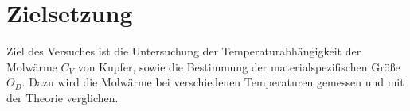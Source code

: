 \section{Zielsetzung}
\label{sec:zielsetzung}
%
Ziel des Versuches ist die Untersuchung der Temperaturabhängigkeit der Molwärme $C_V$ von Kupfer, sowie die Bestimmung der materialspezifischen Größe $\Theta_D$. Dazu wird die Molwärme bei verschiedenen Temperaturen gemessen und mit der Theorie verglichen.

